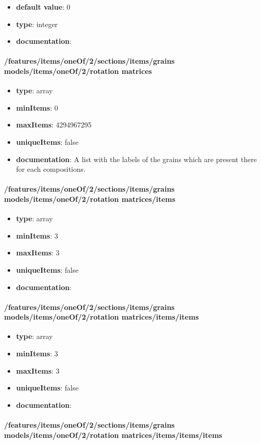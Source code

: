 \begin{itemize}\item {\bf default value}: 0
\item {\bf type}: integer
\item {\bf documentation}: 
\end{itemize}\paragraph{/features/items/oneOf/2/sections/items/grains models/items/oneOf/2/rotation matrices}
\begin{itemize}\item {\bf type}: array
\item {\bf minItems}: 0
\item {\bf maxItems}: 4294967295
\item {\bf uniqueItems}: false
\item {\bf documentation}: A list with the labels of the grains which are present there for each compositions.
\end{itemize}\paragraph{/features/items/oneOf/2/sections/items/grains models/items/oneOf/2/rotation matrices/items}
\begin{itemize}\item {\bf type}: array
\item {\bf minItems}: 3
\item {\bf maxItems}: 3
\item {\bf uniqueItems}: false
\item {\bf documentation}: 
\end{itemize}\paragraph{/features/items/oneOf/2/sections/items/grains models/items/oneOf/2/rotation matrices/items/items}
\begin{itemize}\item {\bf type}: array
\item {\bf minItems}: 3
\item {\bf maxItems}: 3
\item {\bf uniqueItems}: false
\item {\bf documentation}: 
\end{itemize}\paragraph{/features/items/oneOf/2/sections/items/grains models/items/oneOf/2/rotation matrices/items/items/items}
